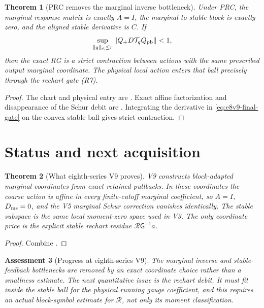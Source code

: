 \documentclass[11pt,oneside]{book}
\newtheorem{theorem}{Theorem}[chapter]
\newtheorem{assessment}[theorem]{Assessment}
\theoremstyle{definition}
\theoremstyle{remark}
\begin{document}
\begin{theorem}[PRC removes the marginal inverse bottleneck]
\label{thm:e8v9-card}
Under PRC, the marginal response matrix is exactly \(A=I\), the
marginal-to-stable block is exactly zero, and the aligned stable
derivative is \(C\).  If
\[
 \sup_{\|q\|_{\rm st}\le r}\|Q_+D{\cal T}_qQ_{\rm pb}\|
 <1,                                                 \label{eq:e8v9-final-gate}
\]
then the exact RG is a strict contraction between actions with the
same prescribed output marginal coordinate.  The physical local
action enters that ball precisely through the rechart gate (R7).
\end{theorem}

\begin{proof}
The chart and physical entry are
.  Exact affine factorization
and disappearance of the Schur debit are
.  Integrating the derivative
in \eqref{eq:e8v9-final-gate} on the convex stable ball gives strict
contraction.
\end{proof}

\section{Status and next acquisition}
\label{sec:e8v9-status}

\begin{theorem}[What eighth-series V9 proves]
\label{thm:e8v9-result}
V9 constructs block-adapted marginal coordinates from exact retained
pullbacks.  In these coordinates the coarse action is affine in every
finite-cutoff marginal coefficient, so \(A=I\),
\(D_{\rm ms}=0\), and the V5 marginal Schur correction vanishes
identically.  The stable subspace is the same local moment-zero space
used in V3.  The only coordinate price is the explicit stable
rechart residue \({\mathscr R}{\mathsf G}^{-1}a\).
\end{theorem}

\begin{proof}
Combine
.
\end{proof}

\begin{assessment}[Progress at eighth-series V9]
\label{ass:e8v9-status}
The marginal inverse and stable-feedback bottlenecks are removed by
an exact coordinate choice rather than a smallness estimate.  The
next quantitative issue is the rechart debit.  It must fit inside the
stable ball for the physical running gauge coefficient, and this
requires an actual block-symbol estimate for
\({\mathscr R}\), not only its moment classification.
\end{assessment}
\end{document}
